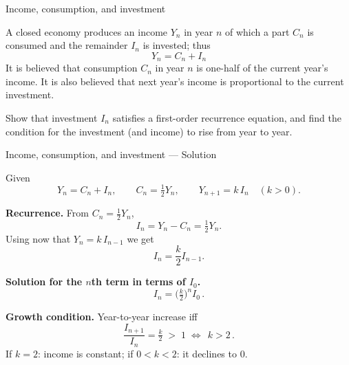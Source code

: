\documentclass[9pt]{beamer}
\begin{document}
    

\begin{frame}{Income, consumption, and investment}

    A closed economy produces an income $Y_n$ in year $n$ of which a part $C_n$ is consumed and the remainder $I_n$ is invested; thus 
    $$
    Y_n = C_n + I_n
    $$
    It is believed that consumption $C_n$ in year $n$ is one-half of the current year's income. %
    It is also believed that next year's income is proportional to the current investment. %
    
    Show that investment $I_n$ satisfies a first-order recurrence equation, and find the condition for the investment (and income) to rise from year to year.
    
\end{frame}

\begin{frame}{Income, consumption, and investment — Solution}

Given
\[
Y_n=C_n+I_n,\qquad C_n=\tfrac12 Y_n,\qquad Y_{n+1}=k\,I_n\quad (k>0).
\]

\textbf{Recurrence.} From $C_n=\tfrac12 Y_n$,
\[
I_n=Y_n-C_n=\tfrac12 Y_n.
\]
Using now that $Y_{n}=k\,I_{n-1}$ we get
\[
I_n=\frac{k}{2}I_{n-1}.
\]

\textbf{Solution for the $n$th term in terms of $I_0$.}
\[
I_n=\Big(\tfrac{k}{2}\Big)^n I_0\,.
\]

\textbf{Growth condition.} Year-to-year increase iff
\[
\frac{I_{n+1}}{I_n}=\tfrac{k}{2} \;>\;1
\;\Longleftrightarrow\;
\boxed{\,k>2\,}.
\]
If $k=2$: income is constant; if $0<k<2$: it declines to $0$.
\end{frame}
\end{document}
